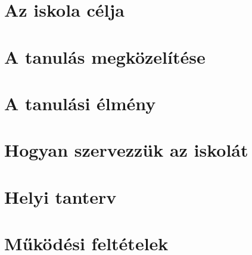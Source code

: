 \documentclass[10pt,openright,twoside]{book}
\begin{document}
\let\apageref\pageref
\let\autocite\citep


\pagestyle{empty}




\tableofcontents
\mainmatter
\pagestyle{fancy}
\chapter{Az iskola célja}






\chapter{A tanulás megközelítése}





\chapter{A tanulási élmény}










\chapter{Hogyan szervezzük az iskolát}







\chapter{Helyi tanterv}











% 
\chapter{Működési feltételek}


\backmatter

\end{document}
